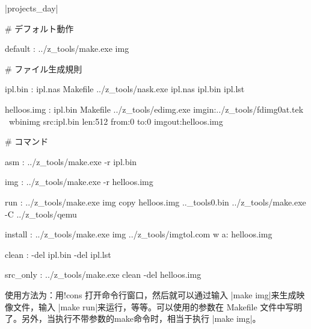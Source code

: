 \dag |projects_day|
\begin{code}[label= Makefile]

# デフォルト動作

default :
	../z_tools/make.exe img

# ファイル生成規則

ipl.bin : ipl.nas Makefile
	../z_tools/nask.exe ipl.nas ipl.bin ipl.lst

helloos.img : ipl.bin Makefile
	../z_tools/edimg.exe   imgin:../z_tools/fdimg0at.tek \
		wbinimg src:ipl.bin len:512 from:0 to:0   imgout:helloos.img

# コマンド

asm :
	../z_tools/make.exe -r ipl.bin

img :
	../z_tools/make.exe -r helloos.img

run :
	../z_tools/make.exe img
	copy helloos.img ..\z_tools\qemu\fdimage0.bin
	../z_tools/make.exe -C ../z_tools/qemu

install :
	../z_tools/make.exe img
	../z_tools/imgtol.com w a: helloos.img

clean :
	-del ipl.bin
	-del ipl.lst

src_only :
	../z_tools/make.exe clean
	-del helloos.img
\end{code}

使用方法为：用!cons 打开命令行窗口，然后就可以通过输入 |make img|来生成映像文件，输入 |make run|来运行，等等。可以使用的参数在 Makefile 文件中写明了。另外，当执行不带参数的make命令时，相当于执行 |make img|。







